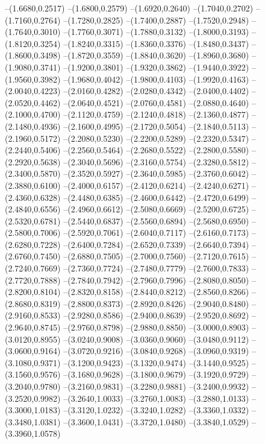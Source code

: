 {\begin{scope}
--(1.6680,0.2517)
--(1.6800,0.2579)
--(1.6920,0.2640)
--(1.7040,0.2702)
--(1.7160,0.2764)
--(1.7280,0.2825)
--(1.7400,0.2887)
--(1.7520,0.2948)
--(1.7640,0.3010)
--(1.7760,0.3071)
--(1.7880,0.3132)
--(1.8000,0.3193)
--(1.8120,0.3254)
--(1.8240,0.3315)
--(1.8360,0.3376)
--(1.8480,0.3437)
--(1.8600,0.3498)
--(1.8720,0.3559)
--(1.8840,0.3620)
--(1.8960,0.3680)
--(1.9080,0.3741)
--(1.9200,0.3801)
--(1.9320,0.3862)
--(1.9440,0.3922)
--(1.9560,0.3982)
--(1.9680,0.4042)
--(1.9800,0.4103)
--(1.9920,0.4163)
--(2.0040,0.4223)
--(2.0160,0.4282)
--(2.0280,0.4342)
--(2.0400,0.4402)
--(2.0520,0.4462)
--(2.0640,0.4521)
--(2.0760,0.4581)
--(2.0880,0.4640)
--(2.1000,0.4700)
--(2.1120,0.4759)
--(2.1240,0.4818)
--(2.1360,0.4877)
--(2.1480,0.4936)
--(2.1600,0.4995)
--(2.1720,0.5054)
--(2.1840,0.5113)
--(2.1960,0.5172)
--(2.2080,0.5230)
--(2.2200,0.5289)
--(2.2320,0.5347)
--(2.2440,0.5406)
--(2.2560,0.5464)
--(2.2680,0.5522)
--(2.2800,0.5580)
--(2.2920,0.5638)
--(2.3040,0.5696)
--(2.3160,0.5754)
--(2.3280,0.5812)
--(2.3400,0.5870)
--(2.3520,0.5927)
--(2.3640,0.5985)
--(2.3760,0.6042)
--(2.3880,0.6100)
--(2.4000,0.6157)
--(2.4120,0.6214)
--(2.4240,0.6271)
--(2.4360,0.6328)
--(2.4480,0.6385)
--(2.4600,0.6442)
--(2.4720,0.6499)
--(2.4840,0.6556)
--(2.4960,0.6612)
--(2.5080,0.6669)
--(2.5200,0.6725)
--(2.5320,0.6781)
--(2.5440,0.6837)
--(2.5560,0.6894)
--(2.5680,0.6950)
--(2.5800,0.7006)
--(2.5920,0.7061)
--(2.6040,0.7117)
--(2.6160,0.7173)
--(2.6280,0.7228)
--(2.6400,0.7284)
--(2.6520,0.7339)
--(2.6640,0.7394)
--(2.6760,0.7450)
--(2.6880,0.7505)
--(2.7000,0.7560)
--(2.7120,0.7615)
--(2.7240,0.7669)
--(2.7360,0.7724)
--(2.7480,0.7779)
--(2.7600,0.7833)
--(2.7720,0.7888)
--(2.7840,0.7942)
--(2.7960,0.7996)
--(2.8080,0.8050)
--(2.8200,0.8104)
--(2.8320,0.8158)
--(2.8440,0.8212)
--(2.8560,0.8266)
--(2.8680,0.8319)
--(2.8800,0.8373)
--(2.8920,0.8426)
--(2.9040,0.8480)
--(2.9160,0.8533)
--(2.9280,0.8586)
--(2.9400,0.8639)
--(2.9520,0.8692)
--(2.9640,0.8745)
--(2.9760,0.8798)
--(2.9880,0.8850)
--(3.0000,0.8903)
--(3.0120,0.8955)
--(3.0240,0.9008)
--(3.0360,0.9060)
--(3.0480,0.9112)
--(3.0600,0.9164)
--(3.0720,0.9216)
--(3.0840,0.9268)
--(3.0960,0.9319)
--(3.1080,0.9371)
--(3.1200,0.9423)
--(3.1320,0.9474)
--(3.1440,0.9525)
--(3.1560,0.9576)
--(3.1680,0.9628)
--(3.1800,0.9679)
--(3.1920,0.9729)
--(3.2040,0.9780)
--(3.2160,0.9831)
--(3.2280,0.9881)
--(3.2400,0.9932)
--(3.2520,0.9982)
--(3.2640,1.0033)
--(3.2760,1.0083)
--(3.2880,1.0133)
--(3.3000,1.0183)
--(3.3120,1.0232)
--(3.3240,1.0282)
--(3.3360,1.0332)
--(3.3480,1.0381)
--(3.3600,1.0431)
--(3.3720,1.0480)
--(3.3840,1.0529)
--(3.3960,1.0578)

\end{scope}}
